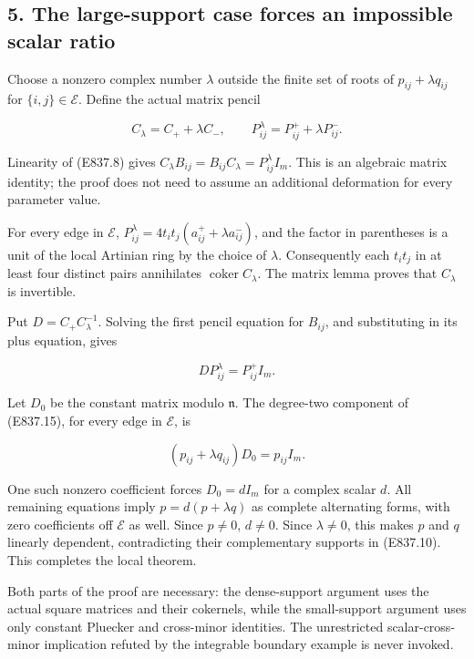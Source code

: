 \subsection{5. The large-support case forces an impossible scalar
ratio}\label{SF-E837:the-large-support-case-forces-an-impossible-scalar-ratio}

Choose a nonzero complex number \(\lambda\) outside the finite set of
roots of \(p_{ij}+\lambda q_{ij}\) for \(\{i,j\}\in\mathcal E\). Define
the actual matrix pencil

\[
 C_\lambda=C_++\lambda C_-,
 \qquad P^\lambda_{ij}=P^+_{ij}+\lambda P^-_{ij}.
 \tag{E837.14}
\]

Linearity of (E837.8) gives
\(C_\lambda B_{ij}=B_{ij}C_\lambda=P^\lambda_{ij}I_m\). This is an
algebraic matrix identity; the proof does not need to assume an
additional deformation for every parameter value.

For every edge in \(\mathcal E\),
\(P^\lambda_{ij}=4t_it_j(a^+_{ij}+\lambda a^-_{ij})\), and the factor in
parentheses is a unit of the local Artinian ring by the choice of
\(\lambda\). Consequently each \(t_it_j\) in at least four distinct
pairs annihilates \(\operatorname{coker}C_\lambda\). The matrix lemma
proves that \(C_\lambda\) is invertible.

Put \(D=C_+C_\lambda^{-1}\). Solving the first pencil equation for
\(B_{ij}\), and substituting in its plus equation, gives

\[
 D P^\lambda_{ij}=P^+_{ij}I_m.
 \tag{E837.15}
\]

Let \(D_0\) be the constant matrix modulo \(\mathfrak n\). The
degree-two component of (E837.15), for every edge in \(\mathcal E\), is

\[
 (p_{ij}+\lambda q_{ij})D_0=p_{ij}I_m.
 \tag{E837.16}
\]

One such nonzero coefficient forces \(D_0=d I_m\) for a complex scalar
\(d\). All remaining equations imply \(p=d(p+\lambda q)\) as complete
alternating forms, with zero coefficients off \(\mathcal E\) as well.
Since \(p\ne0\), \(d\ne0\). Since \(\lambda\ne0\), this makes \(p\) and
\(q\) linearly dependent, contradicting their complementary supports in
(E837.10). This completes the local theorem.

Both parts of the proof are necessary: the dense-support argument uses
the actual square matrices and their cokernels, while the small-support
argument uses only constant Pluecker and cross-minor identities. The
unrestricted scalar-cross-minor implication refuted by the integrable
boundary example is never invoked.

